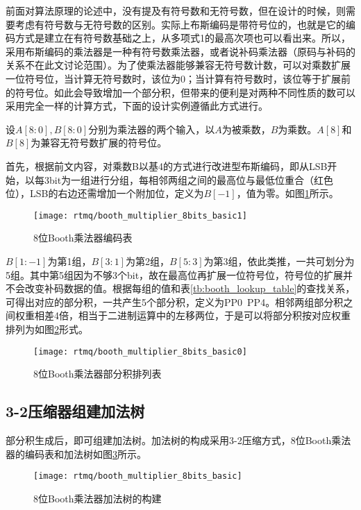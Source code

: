 前面对算法原理的论述中，没有提及有符号数和无符号数，但在设计的时候，则需要考虑有符号数与无符号数的区别。实际上布斯编码是带符号位的，也就是它的编码方式是建立在有符号数基础之上，从多项式1的最高次项也可以看出来。所以，采用布斯编码的乘法器是一种有符号数乘法器，或者说补码乘法器（原码与补码的关系不在此文讨论范围）。为了使乘法器能够兼容无符号数计数，可以对乘数扩展一位符号位，当计算无符号数时，该位为0；当计算有符号数时，该位等于扩展前的符号位。如此会导致增加一个部分积，但带来的便利是对两种不同性质的数可以采用完全一样的计算方式，下面的设计实例遵循此方式进行。

设$A[8:0], B[8:0]$分别为乘法器的两个输入，以$A$为被乘数，$B$为乘数。$A[8]$和$B[8]$为兼容无符号数扩展的符号位。

首先，根据前文内容，对乘数B以基4的方式进行改进型布斯编码，即从LSB开始，以每3bit为一组进行分组，每相邻两组之间的最高位与最低位重合（红色位），LSB的右边还需增加一个附加位，定义为$B[-1]$，值为零。如图\ref{fig:booth_multiplier_8bits_basic1}所示。

\begin{figure}
    \centering
    \caption[8位Booth乘法器编码表]{8位Booth乘法器编码表\label{fig:booth_multiplier_8bits_basic1}}
    \texttt{[image: rtmq/booth\_multiplier\_8bits\_basic1]}
\end{figure}


$B[1:-1]$为第1组，$B[3:1]$为第2组，$B[5:3]$为第3组，依此类推，一共可划分为5组。其中第5组因为不够3个bit，故在最高位再扩展一位符号位，符号位的扩展并不会改变补码数据的值。根据每组的值和表\ref{tb:booth_lookup_table}的查找关系，可得出对应的部分积，一共产生5个部分积，定义为PP0~PP4。相邻两组部分积之间权重相差4倍，相当于二进制运算中的左移两位，于是可以将部分积按对应权重排列为如图\ref{fig:booth_multiplier_8bits_basic0}形式。
\begin{figure}
    \centering
    \caption[8位Booth乘法器部分积排列表]{8位Booth乘法器部分积排列表\label{fig:booth_multiplier_8bits_basic0}}
    \texttt{[image: rtmq/booth\_multiplier\_8bits\_basic0]}
\end{figure}

\subsection[3-2压缩器组建加法树]{3-2压缩器组建加法树}
部分积生成后，即可组建加法树。加法树的构成采用3-2压缩方式，8位Booth乘法器的编码表和加法树如图\ref{fig:booth_multiplier_8bits_basic}所示。

\begin{figure}
    \centering
    \caption[8位Booth乘法器加法树的构建]{8位Booth乘法器加法树的构建\label{fig:booth_multiplier_8bits_basic}}
    \texttt{[image: rtmq/booth\_multiplier\_8bits\_basic]}
\end{figure}

